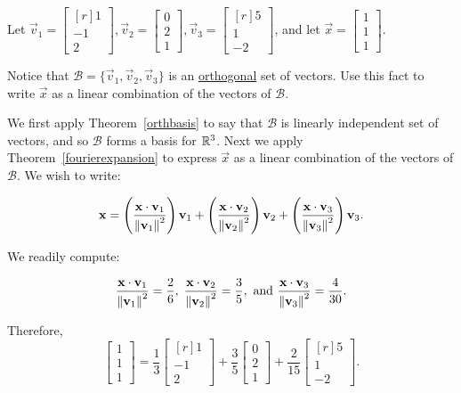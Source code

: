\documentclass{ximera}
\begin{document}
\begin{example}\label{fourier}
Let
$\vec{v}_1= \begin{bmatrix*}[r]
1 \\ -1 \\ 2
\end{bmatrix*},
\vec{v}_2= \begin{bmatrix}
0 \\ 2 \\ 1 
\end{bmatrix},
\vec{v}_3 =\begin{bmatrix*}[r]
5 \\ 1 \\ -2
\end{bmatrix*}$,
and let
$\vec{x} =\begin{bmatrix}
1 \\ 1 \\ 1
\end{bmatrix}$.  

Notice that $\mathcal{B}=\{ \vec{v}_1, \vec{v}_2, \vec{v}_3\}$
is an \underline{orthogonal} set of vectors.  Use this fact to write $\vec{x}$ as  a linear combination of the vectors of $\mathcal{B}$.

\begin{explanation}
We first apply Theorem~\ref{orthbasis} to say that $\mathcal{B}$ is linearly independent set of vectors, and so $\mathcal{B}$ forms a basis for $\mathbb{R}^3$. Next we apply Theorem~\ref{fourierexpansion} to express $\vec{x}$ as  a linear combination of the vectors of $\mathcal{B}$.  We wish to write:

\[
\mathbf{x}   =
\left(\frac{\mathbf{x}\cdot \mathbf{v}_1}{\left\lVert\mathbf{v}_1\right\rVert^2}\right) \mathbf{v}_1 +
\left(\frac{\mathbf{x}\cdot \mathbf{v}_2}{\left\lVert\mathbf{v}_2\right\rVert^2}\right) \mathbf{v}_2 +
\left(\frac{\mathbf{x}\cdot \mathbf{v}_3}{\left\lVert\mathbf{v}_3\right\rVert^2}\right) \mathbf{v}_3.
\]

We readily compute:

\[
\frac{\mathbf{x}\cdot\mathbf{v}_1}{\left\lVert\mathbf{v}_1\right\rVert^2} = \frac{2}{6}, \;
\frac{\mathbf{x}\cdot\mathbf{v}_2}{\left\lVert\mathbf{v}_2\right\rVert^2} = \frac{3}{5},
\mbox{ and }
\frac{\mathbf{x}\cdot\mathbf{v}_3}{\left\lVert\mathbf{v}_3\right\rVert^2} = \frac{4}{30}.\]

Therefore,
\[ \begin{bmatrix}
1 \\ 1 \\ 1
\end{bmatrix}
= \frac{1}{3}\begin{bmatrix*}[r]
1 \\ -1 \\ 2
\end{bmatrix*}
+\frac{3}{5}\begin{bmatrix}
0 \\ 2 \\ 1
\end{bmatrix}
+\frac{2}{15}\begin{bmatrix*}[r]
5 \\ 1 \\ -2
\end{bmatrix*}.\]
\end{explanation} 
\end{example}
\end{document}
